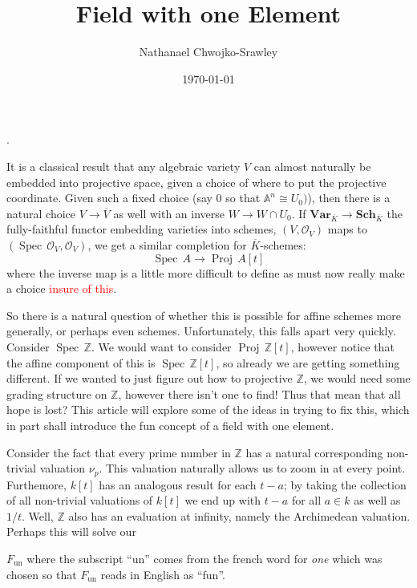 \documentclass{article}
\title{Field with one Element}
\author{Nathanael Chwojko-Srawley}
\date{\today}
\renewcommand{\maketitle}{
    \quad
    \vspace{1em}
  \begin{center}
      \LARGE\bfseries \thetitle \par
      \vspace{0.6em}
      \large
  \end{center}
    \vspace{1em}
}
\newcommand{\A}{{\mathbb{A}}}
\newcommand{\Z}{{\mathbb{Z}}}
\newcommand{\CO}{{\mathcal{O}}}
\newcommand{\Sch}{{\textbf{Sch}}}
\newcommand{\Var}{{\textbf{Var}}}
\newcommand{\Proj}{{\operatorname{Proj}\,}}
\newcommand{\Spec}{{\operatorname{Spec}\,}}
\begin{document}
.
\maketitle

It is a classical result that any algebraic variety $V$ can almost naturally be embedded into projective
space, given a choice of where to put the projective coordinate. Given such a fixed choice (say $0$ so that
$\A^n \cong U_0)$), then there is a natural choice $V \to \overline{V}$ as well with an inverse $W \to
W\cap U_0$. If $\Var_{\overline{K}}  \to \Sch_{\overline{K}}$ the fully-faithful functor embedding varieties
into schemes, $(V, \CO_V)$ maps to
$(\Spec \CO_V, \CO_V)$, we get a similar completion for
$\overline{K}$-schemes:
\[
  \Spec A \to \Proj A[t]
\]
where the inverse map is a little more difficult to define as must now really make a choice
\textcolor{red}{insure of this}.

So there is a natural question of whether this is possible for affine schemes more generally, or perhaps even
schemes. Unfortunately, this falls apart very quickly. Consider $\Spec \Z$. We would want to consider $\Proj
\Z[t]$, however notice that the affine component of this is $\Spec \Z[t]$, so already we are getting something
different. If we wanted to just figure out how to projective $\Z$, we would need some grading structure on
$\Z$, however there isn't one to find! Thus that mean that all hope is lost? This article will explore some of
the ideas in trying to fix this, which in part shall introduce the fun concept of a field with one element.

Consider the fact that every prime number in $\Z$ has a natural corresponding non-trivial valuation $\nu_p$.
This valuation naturally allows us to zoom in at every point. Furthemore, $k[t]$ has an analogous result for
each $t-a$; by taking the collection of all non-trivial valuations of $k[t]$ we end up with $t-a$ for all $a
\in k$ as well as $1/t$. Well, $\Z$ also has an evaluation at infinity, namely the Archimedean valuation.
Perhaps this will solve our

$F_{\operatorname{un}}$ where the subscript ``un'' comes from the french word for \emph{one} which was chosen
so that $F_{\operatorname{un}}$ reads in English as ``fun''.



\end{document}
